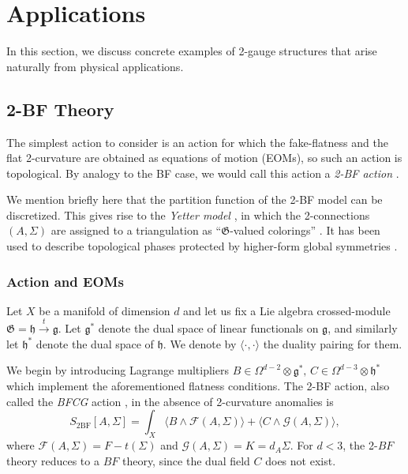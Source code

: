 \documentclass[onecolumn]{article}
\theoremstyle{theorem}
\theoremstyle{remark}
\theoremstyle{example}
\theoremstyle{definition}
\numberwithin{equation}{section}
\def\g{\mathfrak g}
\def\h{\mathfrak h}
\begin{document}
\section{Applications}\label{sec:2app}
In this section, we discuss concrete examples of 2-gauge structures that arise naturally from physical applications.


\subsection{2-BF Theory}\label{sec:actions}
The simplest action to consider is an action for which  the fake-flatness and the flat 2-curvature  are obtained as equations of motion (EOMs), so such an action is topological. By analogy to the BF case, we would call this action a \textit{{2-BF action}} \cite{Martins:2010ry,Radenkovic:2019qme}. 

We mention briefly here that the partition function of the 2-BF model can be  discretized. This gives rise to the \textit{{Yetter model}} \cite{Yetter:1992rz, Bullivant:2016clk,Bochniak_2021}, in which the 2-connections $(A,\Sigma)$ are assigned to a triangulation  as ``$\mathfrak{G}$-valued colorings'' \cite{Kapustin:2013uxa,Cui_2017}. It has been used to describe topological phases protected by higher-form global symmetries \cite{Kapustin:2013uxa,Zhu:2019,Thorngren2015}.

\subsubsection{Action and EOMs} 
Let $X$ be a manifold of dimension $d$ and let us fix a Lie algebra crossed-module $\mathfrak{G}=\h\xrightarrow{t}\g$. Let $\g^*$ denote the dual space of linear functionals on $\g$, and similarly let $\h^*$ denote the dual space of $\h$. We denote by $\langle\cdot,\cdot\rangle$ the duality pairing for them.

We begin by introducing Lagrange multipliers  $B\in \Omega^{d-2}\otimes\mathfrak{g}^*,\, C\in \Omega^{d-3}\otimes\mathfrak{h}^*$ which implement the aforementioned flatness conditions. The 2-BF action, also called the \textit{BFCG} action \cite{Martins:2010ry,Radenkovic:2019qme}, in the absence of 2-curvature {anomalies is} %
\begin{equation}
    S_\text{2BF}[A,\Sigma] = \int_X \langle B \wedge\mathcal{F}(A,\Sigma)\rangle + \langle C\wedge \mathcal{G}(A,\Sigma)\rangle,\label{eq:2bf}
\end{equation}
where $\mathcal{F}(A,\Sigma) = F - t(\Sigma)$ and $\mathcal{G}(A,\Sigma)=K = d_A\Sigma$. For $d<3$, the 2-$BF$ theory reduces to a $BF$ theory, since the dual field $C$ does not exist. 
\end{document}
